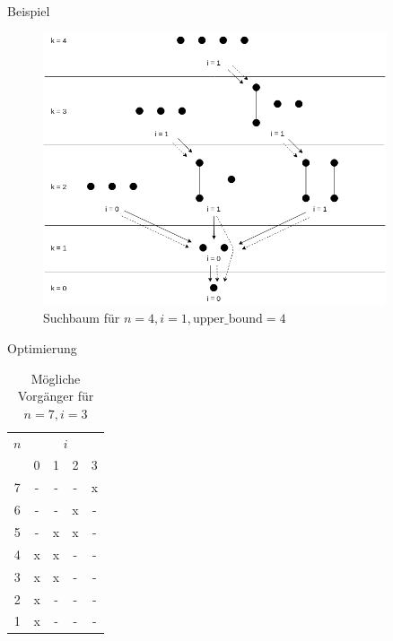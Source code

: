 \begin{frame}{Beispiel}
  \begin{figure}[!b]
    \centering
    \includegraphics[width=0.9\textwidth,height=0.67\textheight,keepaspectratio]{./figures/backward-searchtree-bound4.png}
    \caption{Suchbaum für $n=4,i=1,\text{upper\_bound}=4$}
    \label{fig:backward-searchtree-bound4}
  \end{figure}
\end{frame}

\begin{frame}{Optimierung}
  \begin{table}[!t]
    \renewcommand{\arraystretch}{1.2}
    \centering
    \begin{tabular}{c|cccc}
      $n$ & \multicolumn{4}{c}{$i$}             \\
          & 0                       & 1 & 2 & 3 \\ \hline
      7   & -                       & - & - & x \\
      6   & -                       & - & x & - \\
      5   & -                       & x & x & - \\
      4   & x                       & x & - & - \\
      3   & x                       & x & - & - \\
      2   & x                       & - & - & - \\
      1   & x                       & - & - & - \\
    \end{tabular}%
    \caption{Mögliche Vorgänger für $n = 7,i = 3$}
  \end{table}
\end{frame}

